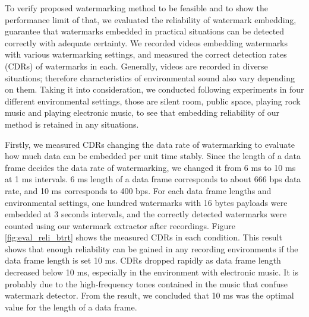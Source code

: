 To verify proposed watermarking method to be feasible and to show the performance limit of that, we evaluated the reliability of watermark embedding, guarantee that watermarks embedded in practical situations can be detected correctly with adequate certainty.
We recorded videos embedding watermarks with various watermarking settings, and measured the correct detection rates (CDRs) of watermarks in each.
Generally, videos are recorded in diverse situations; therefore characteristics of environmental sound also vary depending on them.
Taking it into consideration, we conducted following experiments in four different environmental settings, those are silent room, public space, playing rock music and playing electronic music, to see that embedding reliability of our method is retained in any situations.

Firstly, we measured CDRs changing the data rate of watermarking to evaluate how much data can be embedded per unit time stably.
Since the length of a data frame decides the data rate of watermarking, we changed it from 6 ms to 10 ms at 1 ms intervals.
6 ms length of a data frame corresponds to about 666 bps data rate, and 10 ms corresponds to 400 bps.
For each data frame lengths and environmental settings, one hundred watermarks with 16 bytes payloads were embedded at 3 seconds intervals, and the correctly detected watermarks were counted using our watermark extractor after recordings.
Figure \ref{fig:eval_reli_btrt} shows the measured CDRs in each condition.
This result shows that enough reliability can be gained in any recording environments if the data frame length is set 10 ms.
CDRs dropped rapidly as data frame length decreased below 10 ms, especially in the environment with electronic music.
It is probably due to the high-frequency tones contained in the music that confuse watermark detector.
From the result, we concluded that 10 ms was the optimal value for the length of a data frame.

